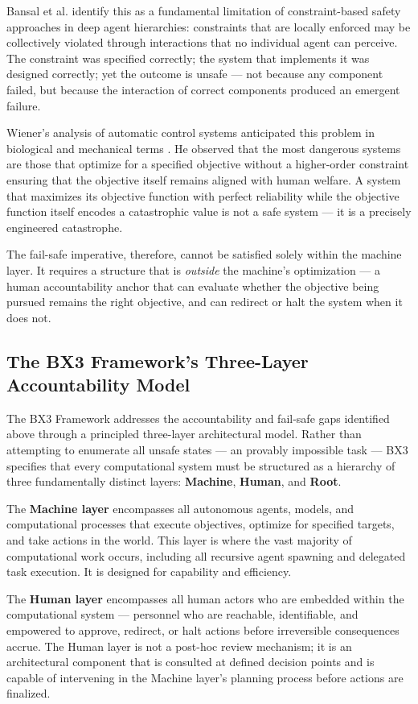 Bansal et al. \cite{bansal2019} identify this as a fundamental limitation of constraint-based safety approaches in deep agent hierarchies: constraints that are locally enforced may be collectively violated through interactions that no individual agent can perceive. The constraint was specified correctly; the system that implements it was designed correctly; yet the outcome is unsafe — not because any component failed, but because the interaction of correct components produced an emergent failure.

Wiener's analysis of automatic control systems anticipated this problem in biological and mechanical terms \cite{wiener1948}. He observed that the most dangerous systems are those that optimize for a specified objective without a higher-order constraint ensuring that the objective itself remains aligned with human welfare. A system that maximizes its objective function with perfect reliability while the objective function itself encodes a catastrophic value is not a safe system — it is a precisely engineered catastrophe.

The fail-safe imperative, therefore, cannot be satisfied solely within the machine layer. It requires a structure that is \emph{outside} the machine's optimization — a human accountability anchor that can evaluate whether the objective being pursued remains the right objective, and can redirect or halt the system when it does not.

\subsection{The BX3 Framework's Three-Layer Accountability Model}

The BX3 Framework addresses the accountability and fail-safe gaps identified above through a principled three-layer architectural model. Rather than attempting to enumerate all unsafe states — an provably impossible task — BX3 specifies that every computational system must be structured as a hierarchy of three fundamentally distinct layers: \textbf{Machine}, \textbf{Human}, and \textbf{Root}.

The \textbf{Machine layer} encompasses all autonomous agents, models, and computational processes that execute objectives, optimize for specified targets, and take actions in the world. This layer is where the vast majority of computational work occurs, including all recursive agent spawning and delegated task execution. It is designed for capability and efficiency.

The \textbf{Human layer} encompasses all human actors who are embedded within the computational system — personnel who are reachable, identifiable, and empowered to approve, redirect, or halt actions before irreversible consequences accrue. The Human layer is not a post-hoc review mechanism; it is an architectural component that is consulted at defined decision points and is capable of intervening in the Machine layer's planning process before actions are finalized.

